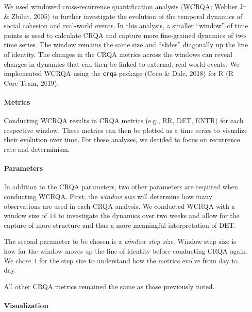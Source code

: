 \documentclass[english,man]{apa6}
\begin{document}
We used windowed cross-recurrence quantification analysis
(WCRQA; Webber Jr \& Zbilut, 2005) to further investigate the evolution of the
temporal dynamics of social cohesion and real-world events. In this analysis,
a smaller \enquote{window} of time points is used to calculate CRQA and capture more
fine-grained dynamics of two time series. The window remains the same size and
\enquote{slides} diagonally up the line of identity. The changes in the CRQA metrics
across the windows can reveal changes in dynamics that can then be linked to
external, real-world events.
We implemented WCRQA using the \texttt{crqa} package (Coco \& Dale, 2018) for R (R Core Team, 2019).

\hypertarget{metrics-1}{%
\paragraph{Metrics}\label{metrics-1}}

Conducting WCRQA results in CRQA metrics (e.g., RR, DET, ENTR) for each
respective window. These metrics can then be plotted as a time series to
visualize their evolution over time. For these analyses, we decided to
focus on recurrence rate and determinism.

\hypertarget{parameters-1}{%
\paragraph{Parameters}\label{parameters-1}}

In addition to the CRQA parameters, two other parameters are required when
conducting WCRQA. First, the \emph{window size}
will determine how many observations are used in each CRQA analysis. We
conducted WCRQA with a window size of \(14\) to investigate the dynamics over
two weeks and allow for the capture of more structure and thus a more
meaningful interpretation of DET.

The second parameter to be chosen is a \emph{window step size}.
Window step size is how far the window moves up the line of identity
before conducting CRQA again. We chose \(1\) for the step size to understand
how the metrics evolve from day to day.

All other CRQA metrics remained the same as those previously noted.

\hypertarget{visualization-1}{%
\paragraph{Visualization}\label{visualization-1}}
\end{document}
